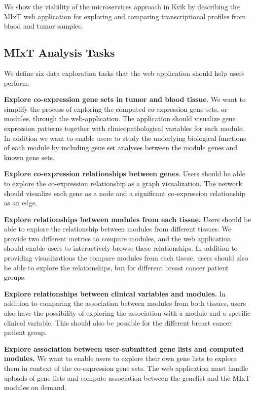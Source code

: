 We show the viability of the microservices approach in Kvik by describing the
MIxT web application for exploring and comparing
transcriptional profiles from blood and tumor samples. 

\subsection*{MIxT Analysis Tasks}

We define six data exploration tasks that the web application should help users
perform: 

\textbf{Explore co-expression gene sets in tumor and blood tissue}. We want to
simplify the process of exploring the computed co-expression gene sets, or
modules, through the web-application. The application should 
visualize gene expression patterns together with clinicopathological variables
for each module. In addition we want to enable users to study the underlying
biological functions of each module by including gene set analyses between the
module genes and known gene sets. 

\textbf{Explore co-expression relationships between genes}. Users should be able
to explore the co-expression relationship as a graph visualization. The network
should visualize each gene as a node and a significant co-expression
relationship as an edge.  

\textbf{Explore relationships between modules from each tissue.} Users should be
able to explore the relationship between modules from different tissues. We
provide two different metrics to compare modules, and the web application should
enable users to interactively browse these relationships. In addition to
providing visualizations the compare modules from each tissue, users should also
be able to explore the relationships, but for different breast cancer patient
groups. 

\textbf{Explore relationships between clinical variables and modules.} In
addition to comparing the association between modules from both tissues, users
also have the possibility of exploring the association with a module and a
specific clinical variable. This should also be possible for the different
breast cancer patient group. 

\textbf{Explore association between user-submitted gene lists and computed
modules.} We want to enable users to explore their own gene lists to explore
them in context of
the co-expression gene sets. The web application must handle uploads of gene
lists and compute association between the genelist and the MIxT modules on
demand. 

